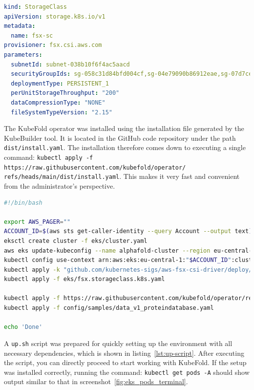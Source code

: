 \begin{lstlisting}[language=yaml,caption={Definition of \texttt{StorageClass} for FSx CSI Driver},label={lst:storage-class}]
kind: StorageClass
apiVersion: storage.k8s.io/v1
metadata:
  name: fsx-sc
provisioner: fsx.csi.aws.com
parameters:
  subnetId: subnet-038b10f6f4ac5aacd
  securityGroupIds: sg-058c31d84bfd004cf,sg-04e79090b86912eae,sg-07d7ceb3fa050568c,sg-02a2a067c7f724318
  deploymentType: PERSISTENT_1
  perUnitStorageThroughput: "200"
  dataCompressionType: "NONE"
  fileSystemTypeVersion: "2.15"
\end{lstlisting}

The KubeFold operator was installed using the installation file generated by the KubeBuilder tool.
It is located in the GitHub code repository under the path \texttt{dist/install.yaml}.
The installation therefore comes down to executing a single command: \texttt{kubectl apply -f https://raw.githubusercontent.com/kubefold/operator/ \n refs/heads/main/dist/install.yaml}.
This makes it very fast and convenient from the administrator's perspective.

\begin{lstlisting}[language=bash,caption={Quick project startup script},label={lst:up-script}]
#!/bin/bash

export AWS_PAGER=""
ACCOUNT_ID=$(aws sts get-caller-identity --query Account --output text)
eksctl create cluster -f eks/cluster.yaml
aws eks update-kubeconfig --name alphafold-cluster --region eu-central-1
kubectl config use-context arn:aws:eks:eu-central-1:"$ACCOUNT_ID":cluster/alphafold-cluster
kubectl apply -k "github.com/kubernetes-sigs/aws-fsx-csi-driver/deploy/kubernetes/overlays/stable/?ref=release-1.3"
kubectl apply -f eks/fsx.storageclass.k8s.yaml

kubectl apply -f https://raw.githubusercontent.com/kubefold/operator/refs/heads/main/dist/install.yaml
kubectl apply -f config/samples/data_v1_proteindatabase.yaml

echo 'Done'
\end{lstlisting}

A \texttt{up.sh} script was prepared for quickly setting up the environment with all necessary dependencies, which is shown in listing~\ref{lst:up-script}.
After executing the script, you can directly proceed to start working with KubeFold.
If the setup was installed correctly, running the command:\newline
\texttt{kubectl get pods -A} \newline
should show output similar to that in screenshot~\ref{fig:eks_pods_terminal}.

